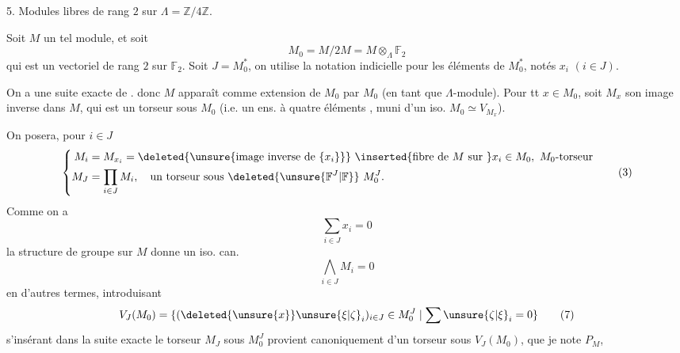 
5. Modules libres de rang $2$ sur $\Lambda=\mathbb Z/4\mathbb Z$.

Soit $M$ un tel module, et soit
\[
M_0=M/2M=M\otimes_\Lambda\mathbb F_2 \tag*{(1)}
\]
qui est un vectoriel de rang $2$ sur $\mathbb F_2$. Soit $J=M_0^*$, on utilise la notation indicielle pour les éléments de $M_0^*$, notés $x_i$ $(i\in J)$. 

On a une suite exacte de  .
donc $M$ apparaît comme extension de $M_0$ par $M_0$ (en tant que $\Lambda$-module). Pour tt $x\in M_0$, soit $M_x$ son image inverse dans $M$, qui est un torseur sous $M_0$ (i.e. un ens. à quatre éléments , muni d'un iso. $M_0\simeq V_{M_x}$).

On posera, pour $i\in J$
\[
\left\{\begin{aligned}
M_i&=M_{x_i}=\deleted{\unsure{\text{image inverse de }\{x_i\}}}\ \inserted{\text{fibre de }M\text{ sur }}x_i\in M_0,\ M_0\text{-torseur}\\
M_J&=\prod_{i\in J}M_i,\quad\text{un torseur sous }\deleted{\unsure{\mathbb F^J|\mathbb F}}\ M_0^J.
\end{aligned}\right. \tag*{(3)}
\]
Comme on a
\[
\sum_{i\in J}x_i=0 \tag*{(4)}
\]
la structure de groupe sur $M$ donne un iso. can.
\[
\bigwedge_{i\in J}M_i=0 \tag*{(6)}
\]
en d'autres termes, introduisant
\[
V_J(M_0)=\{(\deleted{\unsure{x}}\unsure{\xi|\zeta}_i)_{i\in J}\in M_0^J\mid\sum\unsure{\zeta|\xi}_i=0\} \tag*{(7)}
\]
s'insérant dans la suite exacte
le torseur $M_J$ sous $M_0^J$ provient canoniquement d'un torseur sous $V_J(M_0)$, que je note $P_M$,



